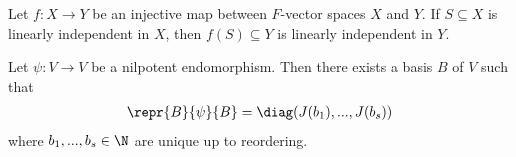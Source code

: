 \documentclass{article}
\begin{document}
\begin{lemma}[Lemma 6.3.7]
	Let $f:X\to Y$ be an injective map between $F$-vector spaces $X$ and $Y$. If $S\subseteq X$
	is linearly independent in $X$, then $f(S)\subseteq Y$ is linearly independent in $Y$.
\end{lemma}

\begin{lemma}[Exercise 91]
	Let $\psi:V\to V$ be a nilpotent endomorphism. Then there exists a basis $B$ of $V$ such that 
	\begin{align*}
		\repr{B}{\psi}{B}=\diag(J(b_1),...,J(b_s))
	\end{align*}
	where $b_1,...,b_s\in\N$ are unique up to reordering.
\end{lemma}
\end{document}
